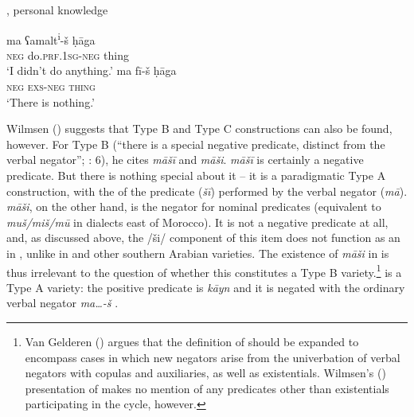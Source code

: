\documentclass[output=paper]{langsci/langscibook}
\begin{document}
\ea\label{cair}
{ , personal knowledge} \\
{\multicolsep=0pt\begin{multicols}{2}\raggedcolumns
\ea\gll ma ʕamalt\textsuperscript{i}{}-š ḥāga\\
     \textsc{neg} do.\textsc{prf.1sg-neg} thing  \\
\glt ‘I didn’t do anything.’
\columnbreak
\ex\gll ma fī-š ḥāga\\
     \textsc{neg} \textsc{exs-neg} \textsc{\textup{thing}}\\
\glt  ‘There is nothing.’
\z\end{multicols}}
\z

Wilmsen (\citeyear[173–175]{Wilmsen2014}) suggests that Type B and Type C constructions can also be found, however. For Type B (“there is a special negative  predicate, distinct from the verbal negator”; \citealt{Croft1991}: 6), he cites  \textit{māšī} and  \textit{māši}.  \textit{māšī} is certainly a negative  predicate. But there is nothing special about it – it is a paradigmatic Type A construction, with the  of the  predicate (\textit{šī}) performed by the verbal negator (\textit{mā}).  \textit{māši}, on the other hand, is the negator for nominal predicates (equivalent to \textit{muš/miš/mū} in dialects east of Morocco). It is not a negative  predicate at all, and, as discussed above, the /ši/ component of this item does not function as an  in , unlike in  and other southern Arabian varieties. The existence of \textit{m}\-\textit{āši} in   is thus irrelevant to the question of whether this constitutes a Type B variety.\footnote{Van Gelderen (\citeyear{VanGelderen2018}) argues that the definition of  should be expanded to encompass cases in which new negators arise from the univerbation of verbal negators with copulas and auxiliaries, as well as existentials. Wilmsen's (\citeyear{Wilmsen2014}) presentation of  makes no mention of any predicates other than existentials participating in the cycle, however.}   is a Type A variety: the positive  predicate is \textit{kāyn} and it is negated with the ordinary  verbal negator \textit{ma…-š} \citep{Caubet2011}.
\end{document}
